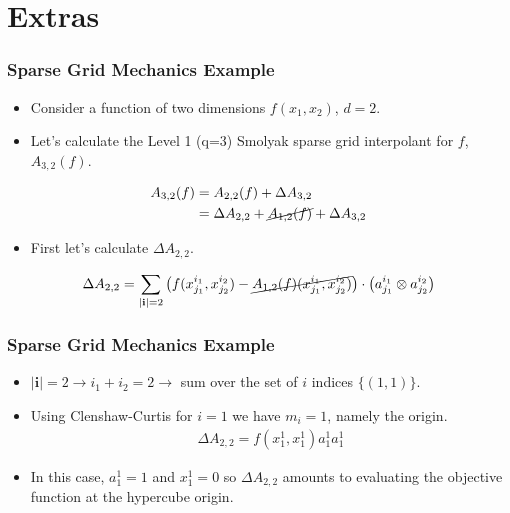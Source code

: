 \documentclass{beamer}
\begin{document}
\section{Extras}

\begin{frame}
\frametitle{Sparse Grid Mechanics Example}

\begin{itemize}
  \item Consider a function of two dimensions $f(x_1, x_2)$, $d=2$. 
  \item Let's calculate the Level 1 (q=3) Smolyak sparse grid interpolant for $f$, $A_{3,2}(f)$.
\end{itemize}

\begin{align*}
A_{3,2}(f) &= A_{2,2}(f) + \Delta A_{3,2} \\
&= \Delta A_{2,2} + \cancel{A_{1,2}(f)} + \Delta A_{3,2} 
\end{align*}

\begin{itemize}
  \item First let's calculate $\Delta A_{2,2}$. 
\end{itemize}

\begin{align*}
    \Delta A_{2,2} = \sum_{\vert\textbf{i}\vert=2}
     \left(f(x_{j_1}^{i_1},x_{j_2}^{i_2}) - 
      \cancel{A_{1,2}(f)(x_{j_1}^{i_1}, x_{j_2}^{i_2})}\right)\cdot
       \left(a_{j_1}^{i_1}\otimes a_{j_2}^{i_2}\right)
\end{align*}

\end{frame}
\begin{frame}
\frametitle{Sparse Grid Mechanics Example}

\begin{itemize}
  \item $\vert\textbf{i}\vert=2 \rightarrow i_1 + i_2 = 2 \rightarrow$ sum over the set of $i$ indices $\lbrace (1, 1)\rbrace$.
  \item Using Clenshaw-Curtis for $i=1$ we have $m_i=1$, namely the origin. 
\begin{align*}
 \Delta A_{2,2} = f\left( x_{1}^{1},x_{1}^{1}\right)a_{1}^{1}a_{1}^{1}
\end{align*}
  \item In this case, $a_1^1 = 1$ and $x_1^1=0$ so $\Delta A_{2,2}$ amounts to evaluating the objective function at the hypercube origin. 
\end{itemize}

\end{frame}
\end{document}
